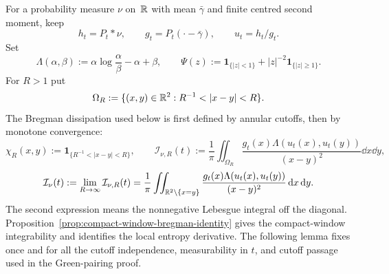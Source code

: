 \noindent
For a probability measure \(\nu\) on~\(\mathbb{R}\) with mean \(\bar{\gamma}\) and
finite centred second moment, keep
\[
h_t=P_t*\nu,\qquad g_t=P_t(\cdot-\bar{\gamma}),\qquad u_t=h_t/g_t .
\]
Set
\[
\Lambda(\alpha,\beta):=\alpha\log\frac{\alpha}{\beta}-\alpha+\beta,
\qquad
\Psi(z):=\mathbf1_{\{|z|<1\}}+|z|^{-2}\mathbf1_{\{|z|\ge1\}}.
\]
For \(R>1\) put
\[
\Omega_R:=\{(x,y)\in\RR^2:R^{-1}<|x-y|<R\}.
\]
The Bregman dissipation used below is first defined by annular cutoffs,
then by monotone convergence:
\[
\chi_R(x,y):=\mathbf1_{\{R^{-1}<|x-y|<R\}},
\qquad
\mathcal I_{\nu,R}(t):=\frac1\pi\iint_{\Omega_R}
\frac{g_t(x)\Lambda(u_t(x),u_t(y))}{(x-y)^2}\dd x\dd y,
\]
\[
\mathcal I_\nu(t):=\lim_{R\to\infty}\mathcal I_{\nu,R}(t)
=\frac1\pi\iint_{\mathbb{R}^2\setminus\{x=y\}}
\frac{g_t(x)\Lambda(u_t(x),u_t(y))}{(x-y)^2}\,\mathrm{d} x\,\mathrm{d} y.
\]
The second expression means the nonnegative Lebesgue integral off the
diagonal.  Proposition~\ref{prop:compact-window-bregman-identity} gives the
compact-window integrability and identifies the local entropy derivative.
The following lemma fixes once and for all the cutoff independence,
measurability in \(t\), and cutoff passage used in the Green-pairing proof.
